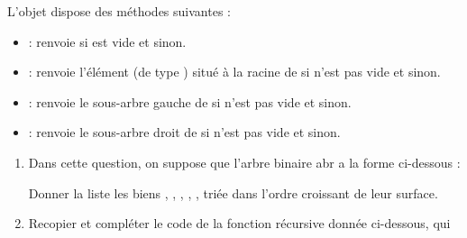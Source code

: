 \documentclass[11pt,a4paper,french,twoside]{PMCours}
\begin{document}
\begin{enumerate}
L'objet  dispose des méthodes suivantes :
\begin{itemize}
\item[]  : renvoie  si  est vide et  sinon.
\item[]  : renvoie l'élément (de type ) situé à la racine de  si  n'est
pas vide et  sinon.
\item[]  : renvoie le sous-arbre gauche de  si  n'est pas vide et 
sinon.
\item[]  : renvoie le sous-arbre droit de  si  n'est pas vide et  sinon.
\end{itemize}

\begin{enumerate}
\item Dans cette question, on suppose que l'arbre binaire abr a la forme ci-dessous :
\begin{center}
\end{center}
Donner la liste les biens , , , , ,  triée dans l'ordre croissant de leur surface.
\item Recopier et compléter le code de la fonction récursive  donnée ci-dessous, qui

\end{enumerate}
\end{enumerate}
\end{document}
